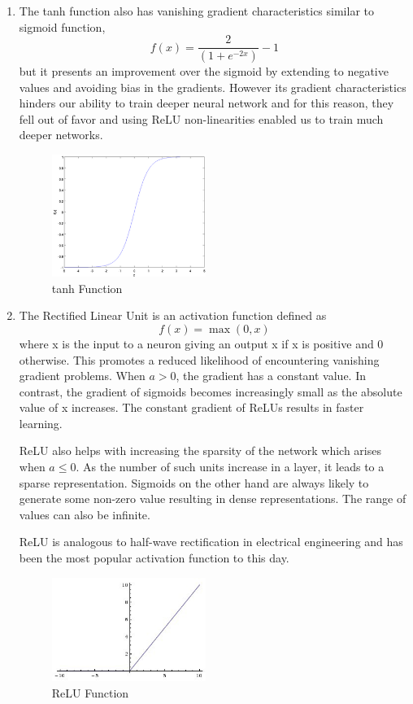 \begin{enumerate}[label=(\alph*)]
\item The tanh function also has vanishing gradient characteristics similar to sigmoid function,
\begin{equation}
    f(x) = \frac{2}{(1+e^{-2x})}-1
\end{equation}
but it presents an improvement over the sigmoid by extending to negative values and avoiding bias in the gradients. 
However its gradient characteristics hinders our ability to train deeper neural network and for this reason, they fell out of favor and using ReLU non-linearities enabled us to train much deeper networks. 

\begin{figure}[ht]
\centering
\includegraphics[width=50mm]{lectures/02-b/tanh_function.png}
\caption{tanh Function}
\label{fig:tanh}
\end{figure}

\item The Rectified Linear Unit is an activation function defined as 
\begin{equation}
    f(x) = \max (0,x)
\end{equation}
where x is the input to a neuron giving an output x if x is positive and 0 otherwise. 
This promotes a reduced likelihood of encountering vanishing gradient problems. When $a > 0$, the gradient has a constant value. 
In contrast, the gradient of sigmoids becomes increasingly small as the absolute value of x increases.
The constant gradient of ReLUs results in faster learning.

ReLU also helps with increasing the sparsity of the network which arises when $a ≤ 0$. 
As the number of such units increase in a layer, it leads to a sparse representation. 
Sigmoids on the other hand are always likely to generate some non-zero value resulting in dense representations. 
The range of values can also be infinite.

ReLU is analogous to half-wave rectification in electrical engineering and has been the most popular activation function to this day.

\begin{figure}[ht]
\centering
\includegraphics[width=50mm]{lectures/02-b/ReLU_function.jpg}
\caption{ReLU Function}
\label{fig:relu}
\end{figure}
\end{enumerate}

